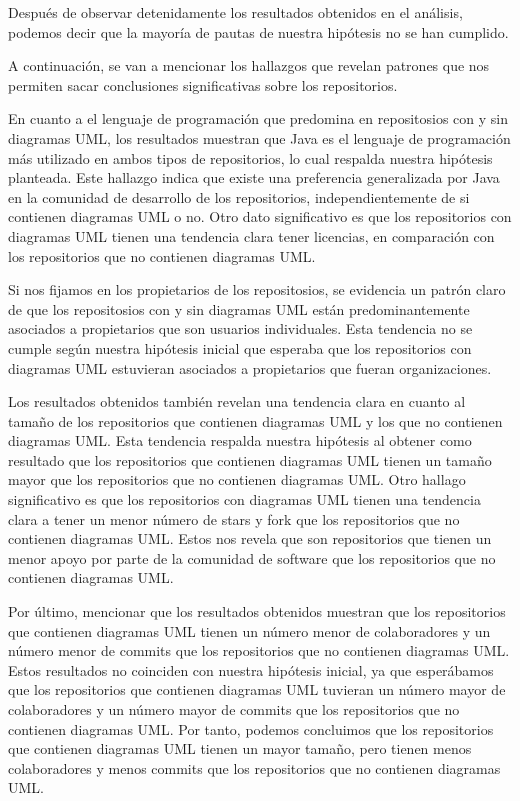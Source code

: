 \documentclass[a4paper, 12pt]{book}
\begin{document}
Después de observar detenidamente los resultados obtenidos en el análisis, podemos decir que la mayoría de pautas de nuestra hipótesis no se han cumplido.


A continuación, se van a mencionar los hallazgos que revelan patrones que nos permiten sacar conclusiones significativas sobre los repositorios.

En cuanto a el lenguaje de programación que predomina en repositosios con y sin diagramas UML, los resultados muestran que Java es el lenguaje de programación más utilizado en ambos tipos de repositorios, lo cual respalda nuestra hipótesis planteada.
Este hallazgo indica que existe una preferencia generalizada por Java en la comunidad de desarrollo de los repositorios, independientemente de si contienen diagramas UML o no.
Otro dato significativo es que los repositorios con diagramas UML tienen una tendencia clara tener licencias, en comparación con los repositorios que no contienen diagramas UML.


Si nos fijamos en los propietarios de los repositosios, se evidencia un patrón claro de que los repositosios con y sin diagramas UML están predominantemente asociados a propietarios que son usuarios individuales.
Esta tendencia no se cumple según nuestra hipótesis inicial que esperaba que los repositorios con diagramas UML estuvieran asociados a propietarios que fueran organizaciones.

Los resultados obtenidos también revelan una tendencia clara en cuanto al tamaño de los repositorios que contienen diagramas UML y los que no contienen diagramas UML.
Esta tendencia respalda nuestra hipótesis al obtener como resultado que los repositorios que contienen diagramas UML tienen un tamaño mayor que los repositorios que no contienen diagramas UML.
Otro hallago significativo es que los repositorios con diagramas UML tienen una tendencia clara a tener un menor número de stars y fork que los repositorios que no contienen diagramas UML.
Estos nos revela que son repositorios que tienen un menor apoyo por parte de la comunidad de software que los repositorios que no contienen diagramas UML.


Por último, mencionar que los resultados obtenidos muestran que los repositorios que contienen diagramas UML tienen un número menor de colaboradores y un número menor de commits que los repositorios que no contienen diagramas UML.
Estos resultados no coinciden con nuestra hipótesis inicial, ya que esperábamos que los repositorios que contienen diagramas UML tuvieran un número mayor de colaboradores y un número mayor de commits que los repositorios que no contienen diagramas UML.
Por tanto, podemos concluimos que los repositorios que contienen diagramas UML tienen un mayor tamaño, pero tienen menos colaboradores y menos commits que los repositorios que no contienen diagramas UML.
\end{document}
